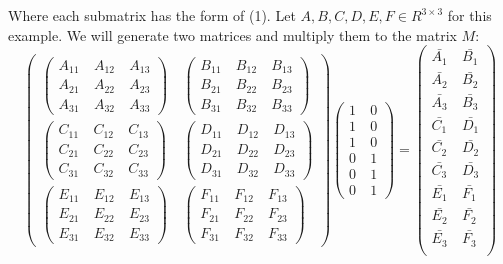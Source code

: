 Where each submatrix has the form of (1). Let $A,B,C,D,E,F \in \!R^{3\times 3}$ for this example. We will generate two matrices and multiply them to the matrix $M$:
\[\begin{pmatrix} \begin{pmatrix} A_{1 1} &\ A_{1 2} &\ A_{1 3}\\
						 A_{2 1} &\ A_{2 2} &\ A_{2 3}\\
                         A_{3 1} &\ A_{3 2} &\ A_{3 3}\end{pmatrix} &\ \begin{pmatrix} B_{1 1} &\ B_{1 2} &\ B_{1 3}\\
						 B_{2 1} &\ B_{2 2} &\ B_{2 3}\\
                         B_{3 1} &\ B_{3 2} &\ B_{3 3}\end{pmatrix} \\ \begin{pmatrix} C_{1 1} &\ C_{1 2} &\ C_{1 3}\\
						 C_{2 1} &\ C_{2 2} &\ C_{2 3}\\
                         C_{3 1} &\ C_{3 2} &\ C_{3 3}\end{pmatrix} &\ \begin{pmatrix} D_{1 1} &\ D_{1 2} &\ D_{1 3}\\
						 D_{2 1} &\ D_{2 2} &\ D_{2 3}\\
                         D_{3 1} &\ D_{3 2} &\ D_{3 3}\end{pmatrix} \\ \begin{pmatrix} E_{1 1} &\ E_{1 2} &\ E_{1 3}\\
						 E_{2 1} &\ E_{2 2} &\ E_{2 3}\\
                         E_{3 1} &\ E_{3 2} &\ E_{3 3}\end{pmatrix} &\ \begin{pmatrix} F_{1 1} &\ F_{1 2} &\ F_{1 3}\\
						 F_{2 1} &\ F_{2 2} &\ F_{2 3}\\
                         F_{3 1} &\ F_{3 2} &\ F_{3 3}\end{pmatrix} \end{pmatrix} \begin{pmatrix} 1 &\ 0 \\ 1 &\ 0 \\ 1 &\ 0 \\0 &\ 1 \\ 0 &\ 1 \\ 0 &\ 1 \end{pmatrix} = 
\begin{pmatrix} \bar{A_1} &\ \bar{B_1} \\ \bar{A_2} &\ \bar{B_2} \\\bar{A_3} &\ \bar{B_3} \\\bar{C_1} &\ \bar{D_1} \\\bar{C_2} &\ \bar{D_2} \\\bar{C_3} &\ \bar{D_3} \\\bar{E_1} &\ \bar{F_1} \\\bar{E_2} &\ \bar{F_2} \\\bar{E_3} &\ \bar{F_3} \\ \end{pmatrix} \]

